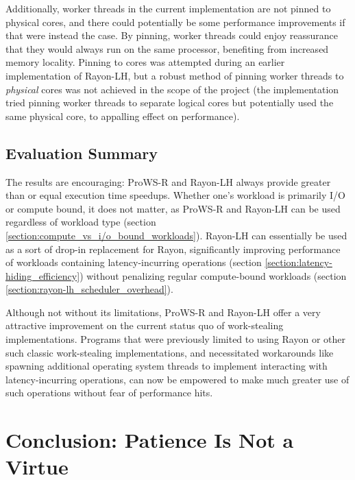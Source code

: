 \documentclass[bsc,frontabs,singlespacing,parskip,deptreport,normalheadings]{infthesis}
\begin{document}
Additionally, worker threads in the current implementation are not pinned to
physical cores, and there could potentially be some performance improvements if
that were instead the case. By pinning, worker threads could enjoy reassurance
that they would always run on the same processor, benefiting from increased
memory locality. Pinning to cores was attempted during an earlier implementation
of Rayon-LH, but a robust method of pinning worker threads to \textit{physical}
cores was not achieved in the scope of the project (the implementation tried
pinning worker threads to separate logical cores but potentially used the same
physical core, to appalling effect on performance).

\section{Evaluation Summary}
\label{section:evaluation_summary}

The results are encouraging: ProWS-R and Rayon-LH always provide greater than or
equal execution time speedups. Whether one's workload is primarily I/O or
compute bound, it does not matter, as ProWS-R and Rayon-LH can be used
regardless of workload type (section
\ref{section:compute_vs_i/o_bound_workloads}). Rayon-LH can essentially be used
as a sort of drop-in replacement for Rayon, significantly improving performance
of workloads containing latency-incurring operations (section
\ref{section:latency-hiding_efficiency}) without penalizing regular
compute-bound workloads (section \ref{section:rayon-lh_scheduler_overhead}).

Although not without its limitations, ProWS-R and Rayon-LH offer a very
attractive improvement on the current status quo of work-stealing
implementations. Programs that were previously limited to using Rayon or other
such classic work-stealing implementations, and necessitated workarounds like
spawning additional operating system threads to implement interacting with
latency-incurring operations, can now be empowered to make much greater use of
such operations without fear of performance hits.


\chapter{Conclusion: Patience Is Not a Virtue}
\label{chapter:conclusion:_patience_is_not_a_virtue}
\end{document}
